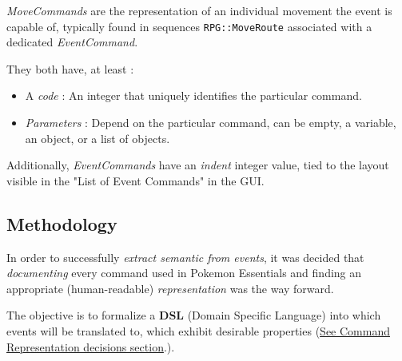 \documentclass[11pt]{article}
\begin{document}
\textit{MoveCommands} are the representation of an individual movement the event is capable of, typically found in sequences \verb|RPG::MoveRoute| associated with a dedicated \textit{EventCommand}.

They both have, at least :
\begin{itemize}
	\item A \textit{code} : An integer that uniquely identifies the particular command.
	\item \textit{Parameters} : Depend on the particular command, can be empty, a variable, an object, or a list of objects.
\end{itemize}

Additionally, \textit{EventCommands} have an \textit{indent} integer value, tied to the layout visible in the "List of Event Commands" in the GUI.


\subsection{Methodology}

In order to successfully \textit{extract semantic from events}, it was decided that \textit{documenting} every command used in Pokemon Essentials and finding an appropriate (human-readable) \textit{representation} was the way forward.

The objective is to formalize a \textbf{DSL} (Domain Specific Language) into which events will be translated to, which exhibit desirable properties (\hyperref[sec:cmdrepr]{See Command Representation decisions section}.).


\end{document}
